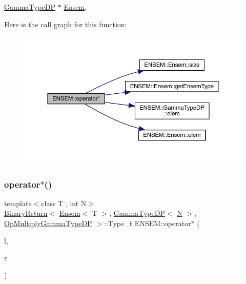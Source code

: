\mbox{\hyperlink{classENSEM_1_1GammaTypeDP}{Gamma\+Type\+DP}} $\ast$ \mbox{\hyperlink{classENSEM_1_1Ensem}{Ensem}}. 

Here is the call graph for this function\+:\nopagebreak
\begin{figure}[H]
\begin{center}
\leavevmode
\includegraphics[width=350pt]{d1/d9e/group__eensem_ga53d61b0a5109e4f59f7b77a3fb4817f9_cgraph}
\end{center}
\end{figure}
\mbox{\label{group__eensem_ga28d880d590e554a96424952e16186000}} 
\subsubsection{\texorpdfstring{operator$\ast$()}{operator*()}\hspace{0.1cm}{\footnotesize\ttfamily [11/11]}}
{\footnotesize\ttfamily template$<$class T , int N$>$ \\
\mbox{\hyperlink{structENSEM_1_1BinaryReturn}{Binary\+Return}}$<$ \mbox{\hyperlink{classENSEM_1_1Ensem}{Ensem}}$<$ T $>$, \mbox{\hyperlink{classENSEM_1_1GammaTypeDP}{Gamma\+Type\+DP}}$<$ \mbox{\hyperlink{operator__name__util_8cc_a7722c8ecbb62d99aee7ce68b1752f337}{N}} $>$, \mbox{\hyperlink{structENSEM_1_1OpMultiplyGammaTypeDP}{Op\+Multiply\+Gamma\+Type\+DP}} $>$\+::Type\+\_\+t E\+N\+S\+E\+M\+::operator$\ast$ (\begin{DoxyParamCaption}\item[{const \mbox{\hyperlink{classENSEM_1_1Ensem}{Ensem}}$<$ T $>$ \&}]{l,  }\item[{const \mbox{\hyperlink{classENSEM_1_1GammaTypeDP}{Gamma\+Type\+DP}}$<$ \mbox{\hyperlink{operator__name__util_8cc_a7722c8ecbb62d99aee7ce68b1752f337}{N}} $>$ \&}]{r }\end{DoxyParamCaption})\hspace{0.3cm}{\ttfamily [inline]}}



